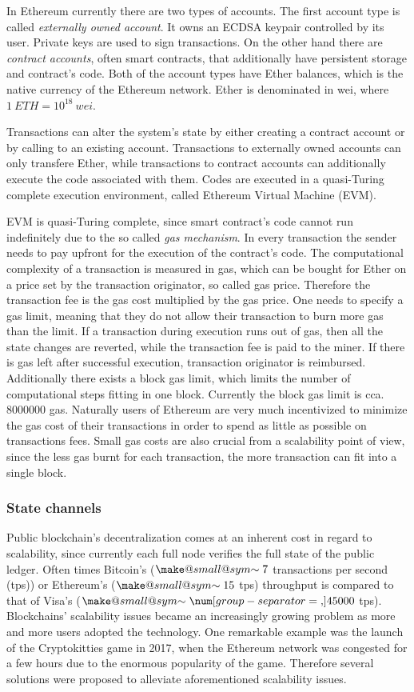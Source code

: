\documentclass[a4paper]{article}
\makeatletter
\theoremstyle{definition}
\newcommand{\smallsim}{\smallsym{\mathrel}{\sim}}
\newcommand{\smallsym}[2]{#1{\mathpalette\make@small@sym{#2}}}
\newcommand{\make@small@sym}[2]{%
	\vcenter{\hbox{$\m@th\downgrade@style#1#2$}}%
}
\newcommand{\downgrade@style}[1]{%
	\ifx#1\displaystyle\scriptstyle\else
	\ifx#1\textstyle\scriptstyle\else
	\scriptscriptstyle
	\fi\fi
}
\makeatother
\begin{document}
In Ethereum currently there are two types of accounts. The first account type is called \textit{externally owned account}. It owns an ECDSA keypair controlled by its user. Private keys are used to sign transactions. On the other hand there are \textit{contract accounts}, often smart contracts, that additionally have persistent storage and contract's code. Both of the account types have Ether balances, which is the native currency of the Ethereum network. Ether is denominated in wei, where $1\ ETH = 10^ {18}\ wei$.

Transactions can alter the system's state by either creating a contract account or by calling to an existing account. Transactions to externally owned accounts can only transfere Ether, while transactions to contract accounts can additionally execute the code associated with them. Codes are executed in a quasi-Turing complete execution environment, called Ethereum Virtual Machine (EVM).

EVM is quasi-Turing complete, since smart contract's code cannot run indefinitely due to the so called \textit{gas mechanism}. In every transaction the sender needs to pay upfront for the execution of the contract's code. The computational complexity of a transaction is measured in gas, which can be bought for Ether on a price set by the transaction originator, so called gas price. Therefore the transaction fee is the gas cost multiplied by the gas price. One needs to specify a gas limit, meaning that they do not allow their transaction to burn more gas than the limit. If a transaction during execution runs out of gas, then all the state changes are reverted, while the transaction fee is paid to the miner. If there is gas left after successful execution, transaction originator is reimbursed. Additionally there exists a block gas limit, which limits the number of computational steps fitting in one block. Currently the block gas limit is cca. $\num[group-separator={,}]{8000000}$ gas. Naturally users of Ethereum are very much incentivized to minimize the gas cost of their transactions in order to spend as little as possible on transactions fees. Small gas costs are also crucial from a scalability point of view, since the less gas burnt for each transaction, the more transaction can fit into a single block.   

\subsubsection{State channels} 
Public blockchain's decentralization comes at an inherent cost in regard to scalability, since currently each full node verifies the full state of the public ledger. Often times Bitcoin's ($\smallsim7$ transactions per second (tps)) or Ethereum's ($\smallsim15$ tps) throughput is compared to that of Visa's ($\smallsim\num[group-separator={,}]{45000}$ tps). Blockchains' scalability issues became an increasingly growing problem as more and more users adopted the technology. One remarkable example was the launch of the Cryptokitties game in 2017, when the Ethereum network was congested for a few hours due to the enormous popularity of the game. Therefore several solutions were proposed to alleviate aforementioned scalability issues.
\end{document}
